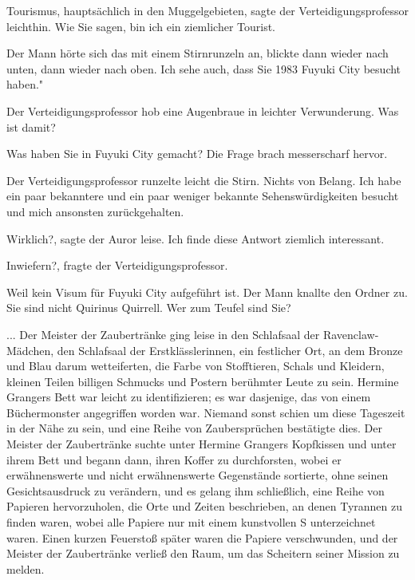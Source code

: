\glqq{}Tourismus, hauptsächlich in den Muggelgebieten\grqq{}, sagte der
Verteidigungsprofessor leichthin. \glqq{}Wie Sie sagen, bin ich ein ziemlicher
Tourist.\grqq{}

Der Mann hörte sich das mit einem Stirnrunzeln an, blickte dann wieder nach
unten, dann wieder nach oben. \glqq{}Ich sehe auch, dass Sie 1983 Fuyuki City
besucht haben."

Der Verteidigungsprofessor hob eine Augenbraue in leichter Verwunderung. \glqq{}
Was ist damit?\grqq{}

\glqq{}Was haben Sie in Fuyuki City gemacht?\grqq{} Die Frage brach messerscharf
hervor.

Der Verteidigungsprofessor runzelte leicht die Stirn. \glqq{}Nichts von Belang.
Ich habe ein paar bekanntere und ein paar weniger bekannte Sehenswürdigkeiten
besucht und mich ansonsten zurückgehalten.\grqq{}

\glqq{}Wirklich?\grqq{}, sagte der Auror leise. \glqq{}Ich finde diese Antwort
ziemlich interessant.\grqq{}

\glqq{}Inwiefern?\grqq{}, fragte der Verteidigungsprofessor.

\glqq{}Weil kein Visum für Fuyuki City aufgeführt ist.\grqq{} Der Mann knallte
den Ordner zu. \glqq{}Sie sind nicht Quirinus Quirrell. Wer zum Teufel sind
Sie?\grqq{}

... Der Meister der Zaubertränke ging leise in den Schlafsaal der
Ravenclaw-Mädchen, den Schlafsaal der Erstklässlerinnen, ein festlicher Ort, an
dem Bronze und Blau darum wetteiferten, die Farbe von Stofftieren, Schals und
Kleidern, kleinen Teilen billigen Schmucks und Postern berühmter Leute zu sein.
Hermine Grangers Bett war leicht zu identifizieren; es war dasjenige, das von
einem Büchermonster angegriffen worden war. Niemand sonst schien um diese
Tageszeit in der Nähe zu sein, und eine Reihe von Zaubersprüchen bestätigte
dies. Der Meister der Zaubertränke suchte unter Hermine Grangers Kopfkissen und
unter ihrem Bett und begann dann, ihren Koffer zu durchforsten, wobei er
erwähnenswerte und nicht erwähnenswerte Gegenstände sortierte, ohne seinen
Gesichtsausdruck zu verändern, und es gelang ihm schließlich, eine Reihe von
Papieren hervorzuholen, die Orte und Zeiten beschrieben, an denen Tyrannen zu
finden waren, wobei alle Papiere nur mit einem kunstvollen \glqq{}S\grqq{}
unterzeichnet waren. Einen kurzen Feuerstoß später waren die Papiere
verschwunden, und der Meister der Zaubertränke verließ den Raum, um das
Scheitern seiner Mission zu melden.

